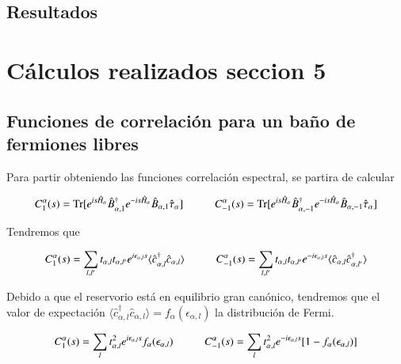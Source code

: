 \begin{appendixs}
    \label{apendix4:secondlaw}
	\subsection{Resultados}

\newpage

\section{Cálculos realizados seccion 5}
\subsection{Funciones de correlación para un baño de fermiones libres}
Para partir obteniendo las funciones correlación espectral, se partira de calcular

\begin{equation*}
    C_{1}^{\alpha}(s) = \text{Tr}[e^{is\hat{H}_{\alpha}}\hat{B}^{\dagger}_{\alpha,1}e^{-is\hat{H}_{\alpha}}\hat{B}_{\alpha,1}\hat{\tau}_{\alpha}  ]  \hspace{10mm} C_{-1}^{\alpha}(s) = \text{Tr}[e^{is\hat{H}_{\alpha}}\hat{B}^{\dagger}_{\alpha,-1}e^{-is\hat{H}_{\alpha}}\hat{B}_{\alpha,-1}\hat{\tau}_{\alpha}  ] 
\end{equation*}

Tendremos que

\begin{equation*}
    C_{1}^{\alpha}(s) = \sum_{l,l'}t_{\alpha,l}t_{\alpha,l'}e^{i\epsilon_{\alpha,l}s} \langle \hat{c}^{\dagger}_{\alpha,l}\hat{c}_{\alpha,l} \rangle \hspace{10mm} C
    ^{\alpha}_{-1}(s) = \sum_{l,l'}t_{\alpha,l}t_{\alpha,l'}e^{-i\epsilon_{\alpha,l}s} \langle \hat{c}_{\alpha,l}\hat{c}^{\dagger}_{\alpha,l'} \rangle
\end{equation*}

Debido a que el reservorio está en equilibrio gran canónico, tendremos que el valor de expectación $\langle \hat{c}^{\dagger}_{\alpha,l}\hat{c}_{\alpha,l}\rangle = f_{\alpha}(\epsilon_{\alpha,l})$ la distribución de Fermi. 

\begin{equation*}
    C_{1}^{\alpha}(s) = \sum_{l}t^{2}_{\alpha,l}e^{i\epsilon_{\alpha,l}s} f_{\alpha}(\epsilon_{\alpha,l}) \hspace{10mm} C
    ^{\alpha}_{-1}(s) = \sum_{l}t^{2}_{\alpha,l}e^{-i\epsilon_{\alpha,l}s} [1-f_{\alpha}(\epsilon_{\alpha,l})]
\end{equation*}


\end{appendixs}
